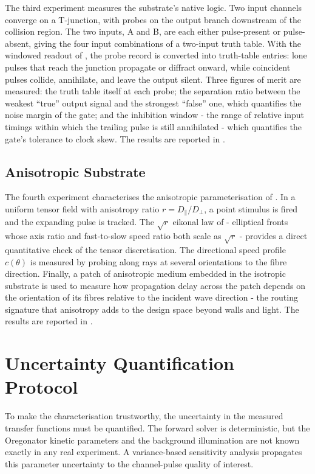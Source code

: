 The third experiment measures the substrate's native logic.
Two input channels converge on a T-junction, with probes on the output branch downstream of the collision region. The two inputs, A and B, are each either pulse-present or pulse-absent, giving the four input combinations of a two-input truth table.
With the windowed readout of , the probe record is converted into truth-table entries: lone pulses that reach the junction propagate or diffract onward, while coincident pulses collide, annihilate, and leave the output silent.
Three figures of merit are measured: the truth table itself at each probe; the separation ratio between the weakest ``true'' output signal and the strongest ``false'' one, which quantifies the noise margin of the gate; and the inhibition window - the range of relative input timings within which the trailing pulse is still annihilated - which quantifies the gate's tolerance to clock skew.
The results are reported in .

\subsection{Anisotropic Substrate}
\label{sec:meth_exp_anisotropy}

The fourth experiment characterises the anisotropic parameterisation of .
In a uniform tensor field with anisotropy ratio $r = D_{\parallel}/D_{\perp}$, a point stimulus is fired and the expanding pulse is tracked. The $\sqrt{r}$ eikonal law of  - elliptical fronts whose axis ratio and fast-to-slow speed ratio both scale as $\sqrt{r}$ - provides a direct quantitative check of the tensor discretisation.
The directional speed profile $c(\theta)$ is measured by probing along rays at several orientations to the fibre direction.
Finally, a patch of anisotropic medium embedded in the isotropic substrate is used to measure how propagation delay across the patch depends on the orientation of its fibres relative to the incident wave direction - the routing signature that anisotropy adds to the design space beyond walls and light.
The results are reported in .

\section{Uncertainty Quantification Protocol}
\label{sec:meth_uq}

To make the characterisation trustworthy, the uncertainty in the measured transfer functions must be quantified.
The forward solver is deterministic, but the Oregonator kinetic parameters and the background illumination are not known exactly in any real experiment.
A variance-based sensitivity analysis propagates this parameter uncertainty to the channel-pulse quality of interest.

